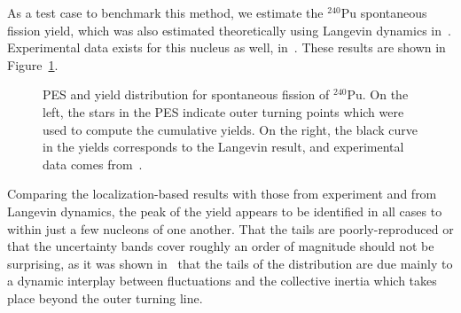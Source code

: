 As a test case to benchmark this method, we estimate the $^{240}$Pu spontaneous fission yield, which was also estimated theoretically using Langevin dynamics in~\cite{Sadhukhan2016}. Experimental data exists for this nucleus as well, in~\cite{Laidler1962, Thierens1981}. These results are shown in Figure~\ref{fig:240Pu-yield}.

\begin{figure}%
	\centering
	\qquad
	\caption{PES and yield distribution for spontaneous fission of $^{240}$Pu. On the left, the stars in the PES indicate outer turning points which were used to compute the cumulative yields. On the right, the black curve in the yields corresponds to the Langevin result, and experimental data comes from~\cite{Laidler1962, Thierens1981}.}%
	\label{fig:240Pu-yield}%
\end{figure}

Comparing the localization-based results with those from experiment and from Langevin dynamics, the peak of the yield appears to be identified in all cases to within just a few nucleons of one another. That the tails are poorly-reproduced or that the uncertainty bands cover roughly an order of magnitude should not be surprising, as it was shown in~\cite{Sadhukhan2016, Sadhukhan2017} that the tails of the distribution are due mainly to a dynamic interplay between fluctuations and the collective inertia which takes place beyond the outer turning line.

